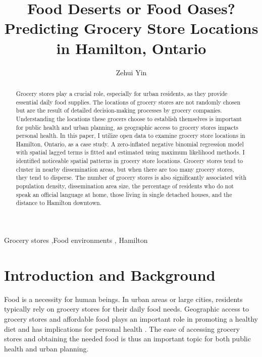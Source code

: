 \documentclass[preprint, 3p,
authoryear]{elsarticle} %
\begin{document}
\begin{frontmatter}

  \title{Food Deserts or Food Oases? Predicting Grocery Store Locations
in Hamilton, Ontario}
    \author[sees]{Zehui Yin%
  }
  
  \begin{abstract}
  Grocery stores play a crucial role, especially for urban residents, as
  they provide essential daily food supplies. The locations of grocery
  stores are not randomly chosen but are the result of detailed
  decision-making processes by grocery companies. Understanding the
  locations these grocers choose to establish themselves is important
  for public health and urban planning, as geographic access to grocery
  stores impacts personal health. In this paper, I utilize open data to
  examine grocery store locations in Hamilton, Ontario, as a case study.
  A zero-inflated negative binomial regression model with spatial lagged
  terms is fitted and estimated using maximum likelihood methods. I
  identified noticeable spatial patterns in grocery store locations.
  Grocery stores tend to cluster in nearby dissemination areas, but when
  there are too many grocery stores, they tend to disperse. The number
  of grocery stores is also significantly associated with population
  density, dissemination area size, the percentage of residents who do
  not speak an official language at home, those living in single
  detached houses, and the distance to Hamilton downtown.
  \end{abstract}
    \begin{keyword}
    Grocery stores \sep Food environments \sep 
    Hamilton
  \end{keyword}
  
 \end{frontmatter}

\section{Introduction and Background}\label{introduction-and-background}

Food is a necessity for human beings. In urban areas or large cities,
residents typically rely on grocery stores for their daily food needs.
Geographic access to grocery stores and affordable food plays an
important role in promoting a healthy diet and has implications for
personal health
\citep{caspi2012relationship, minaker2016retail, kirkpatrick2014dietary}.
The ease of accessing grocery stores and obtaining the needed food is
thus an important topic for both public health and urban planning.
\end{document}
